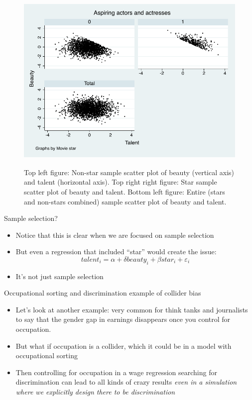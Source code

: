 \documentclass{beamer}
\begin{document}
\begin{frame}[shrink=20,plain]

  \begin{figure}
    \includegraphics[height=9cm]{./lecture_includes/beauty_collider.pdf}
    \caption{Top left figure: Non-star sample scatter plot of beauty (vertical axis) and talent (horizontal axis). Top right right figure: Star sample scatter plot of beauty and talent.  Bottom left figure: Entire (stars and non-stars combined) sample scatter plot of beauty and talent.}
  \end{figure}
\end{frame}

\begin{frame}{Sample selection?}

\begin{itemize}
\item Notice that this is clear when we are focused on sample selection
\item But even a regression that included ``star'' would create the issue:$$talent_i = \alpha + \delta beauty_i + \beta star_i + \varepsilon_i$$
\item It's not just sample selection 
\end{itemize}

\end{frame}


\begin{frame}{Occupational sorting and discrimination example of collider bias}

  \begin{itemize}
    \item Let's look at another example: very common for think tanks and journalists to say that the gender gap in earnings disappears once you control for occupation.
    \item But what if occupation is a collider, which it could be in a model with occupational sorting
    \item Then controlling for occupation in a wage regression searching for discrimination can lead to all kinds of crazy results \emph{even in a simulation where we explicitly design there to be discrimination}
  \end{itemize}

\end{frame}
\end{document}
